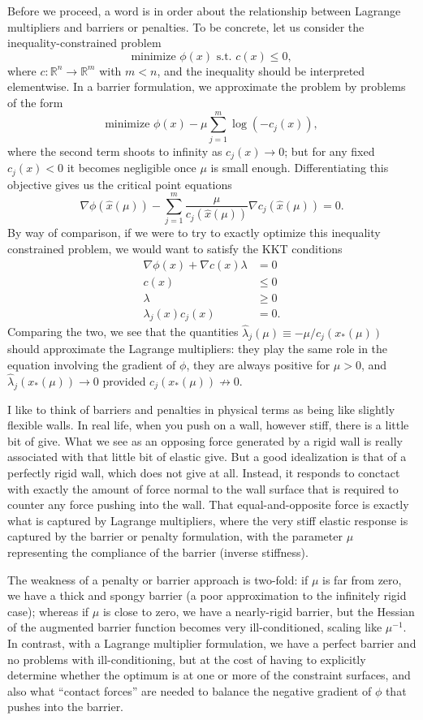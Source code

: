 \documentclass[12pt, leqno]{article} %
\begin{document}
Before we proceed, a word is in order about the relationship between
Lagrange multipliers and barriers or penalties. To be concrete, let us
consider the inequality-constrained problem
\[\mbox{minimize } \phi(x) \mbox{ s.t. } c(x) \leq 0,\] where
\(c : {\mathbb{R}}^n \rightarrow {\mathbb{R}}^m\) with \(m < n\), and
the inequality should be interpreted elementwise. In a barrier
formulation, we approximate the problem by problems of the form
\[\mbox{minimize } \phi(x) - \mu \sum_{j=1}^m \log(-c_j(x)),\] where the
second term shoots to infinity as \(c_j(x) \rightarrow 0\); but for any
fixed \(c_j(x) < 0\) it becomes negligible once \(\mu\) is small enough.
Differentiating this objective gives us the critical point equations
\[\nabla \phi(\hat{x}(\mu))
  -\sum_{j=1}^m \frac{\mu}{c_j(\hat{x}(\mu))} \nabla c_j(\hat{x}(\mu)) = 0.\]
By way of comparison, if we were to try to exactly optimize this
inequality constrained problem, we would want to satisfy the KKT
conditions \begin{align*}
  \nabla \phi(x) + \nabla c(x) \lambda &= 0 \\
  c(x) & \leq 0 \\
  \lambda & \geq 0 \\
  \lambda_j(x) c_j(x) &= 0.
\end{align*} Comparing the two, we see that the quantities
\(\hat{\lambda}_j(\mu) \equiv -\mu/c_j(x_*(\mu))\) should approximate
the Lagrange multipliers: they play the same role in the equation
involving the gradient of \(\phi\), they are always positive for
\(\mu > 0\), and \(\hat{\lambda}_j(x_*(\mu)) \rightarrow 0\) provided
\(c_j(x_*(\mu)) \not \rightarrow 0\).

I like to think of barriers and penalties in physical terms as being
like slightly flexible walls. In real life, when you push on a wall,
however stiff, there is a little bit of give. What we see as an opposing
force generated by a rigid wall is really associated with that little
bit of elastic give. But a good idealization is that of a perfectly
rigid wall, which does not give at all. Instead, it responds to conctact
with exactly the amount of force normal to the wall surface that is
required to counter any force pushing into the wall. That
equal-and-opposite force is exactly what is captured by Lagrange
multipliers, where the very stiff elastic response is captured by the
barrier or penalty formulation, with the parameter \(\mu\) representing
the compliance of the barrier (inverse stiffness).

The weakness of a penalty or barrier approach is two-fold: if \(\mu\) is
far from zero, we have a thick and spongy barrier (a poor approximation
to the infinitely rigid case); whereas if \(\mu\) is close to zero, we
have a nearly-rigid barrier, but the Hessian of the augmented barrier
function becomes very ill-conditioned, scaling like \(\mu^{-1}\). In
contrast, with a Lagrange multiplier formulation, we have a perfect
barrier and no problems with ill-conditioning, but at the cost of having
to explicitly determine whether the optimum is at one or more of the
constraint surfaces, and also what ``contact forces'' are needed to
balance the negative gradient of \(\phi\) that pushes into the barrier.
\end{document}
